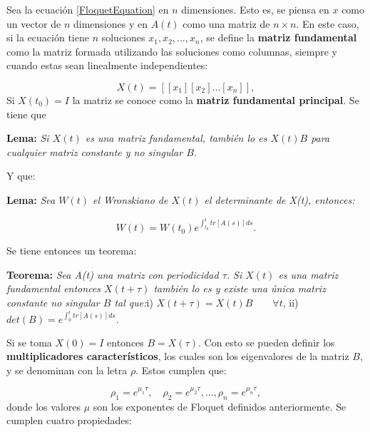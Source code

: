\documentclass[a4paper,10pt]{report}
\begin{document}
Sea la ecuación \ref{FloquetEquation} en $n$ dimensiones. Esto es, se piensa en $x$ como un vector de $n$ dimensiones y en $A(t)$ como una matriz de $n \times n$. En este caso, si la ecuación tiene $n$ soluciones $x_1, x_2, ... , x_n$, se define la \textbf{matriz fundamental} como la matriz formada utilizando las soluciones como columnas, siempre y cuando estas sean linealmente independientes:

\begin{equation}
X(t) = [[x_1][x_2]...[x_n]],
\end{equation}Si $X(t_0) = I$ la matriz se conoce como la \textbf{matriz fundamental principal}. Se tiene que

\begin{center}
\textbf{Lema:} \textit{Si $X(t)$ es una matriz fundamental, también lo es $X(t)B$ para cualquier matriz constante y no singular $B$.}
\end{center}Y que:

\begin{center}
\textbf{Lema:} \textit{Sea $W(t)$ el Wronskiano de $X(t)$ el determinante de X(t), entonces:}

\begin{equation}
W(t) = W(t_0) e^{\int_{t_0}^{t}tr[A(s)]ds}.
\end{equation}
 
\end{center} Se tiene entonces un teorema:

\begin{center}
\textbf{Teorema:} \textit{Sea A(t) una matriz con periodicidad $\tau$. Si $X(t)$ es una matriz fundamental entonces $X(t+\tau)$ también lo es y existe una única matriz constante no singular $B$ tal que:}\linebreak \linebreak i) $X(t+\tau) = X(t)B \qquad\forall t$, \linebreak ii) $det(B) = e^{\int_0^t tr[A(s)]ds}.$
\end{center}Si se toma $X(0)=I$ entonces $B=X(\tau)$. Con esto se pueden definir los \textbf{multiplicadores característicos}, los cuales son los eigenvalores de la matriz $B$, y se denominan con la letra $\rho$. Estos cumplen que:

\begin{equation}
\rho_1 = e^{\mu_1 \tau}, \quad \rho_2 = e^{\mu_2 \tau}, ... , \rho_n = e^{\mu_n \tau},
\end{equation} donde los valores $\mu$ son los exponentes de Floquet definidos anteriormente. Se cumplen cuatro propiedades:
\end{document}
